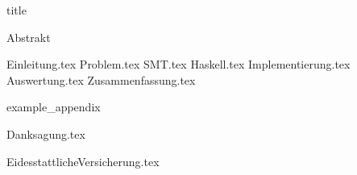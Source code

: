 \documentclass[12pt]{scrreport}
\begin{document}
    {title}

    \frontmatter

    {Abstrakt}
    \newpage

    \tableofcontents


    \mainmatter

    {Einleitung.tex}
    {Problem.tex}
    {SMT.tex}
    {Haskell.tex}
    {Implementierung.tex}
    {Auswertung.tex}
    {Zusammenfassung.tex}

    \printbibliography[heading = bibintoc, title = Literatur]    %

    \printnoidxglossaries

    \addappendix
    {example_appendix}
    \newpage


    \clearpage
    {Danksagung.tex}
    \newpage

    \clearpage
    {EidesstattlicheVersicherung.tex}


\end{document}
